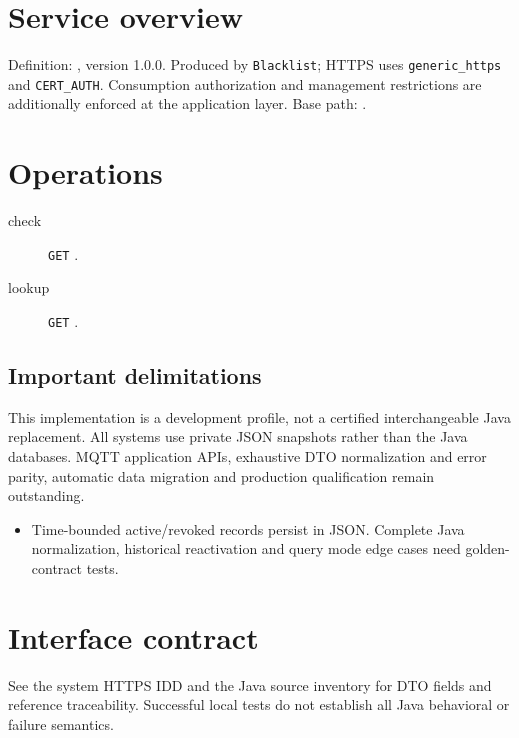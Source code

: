 \documentclass[a4paper]{arrowhead}
\begin{document}
\ArrowheadSetup
\section{Service overview}
Definition: , version 1.0.0. Produced by \texttt{Blacklist}; HTTPS uses \texttt{generic\_https} and \texttt{CERT\_AUTH}. Consumption authorization and management restrictions are additionally enforced at the application layer. Base path: .
\section{Operations}
\begin{description}
\item[check] \texttt{GET} .
\item[lookup] \texttt{GET} .
\end{description}
\subsection{Important delimitations}
This implementation is a development profile, not a certified interchangeable Java replacement. All systems use private JSON snapshots rather than the Java databases. MQTT application APIs, exhaustive DTO normalization and error parity, automatic data migration and production qualification remain outstanding.
\begin{itemize}
\item Time-bounded active/revoked records persist in JSON. Complete Java normalization, historical reactivation and query mode edge cases need golden-contract tests.
\end{itemize}
\section{Interface contract}
See the system HTTPS IDD and the Java source inventory for DTO fields and reference traceability. Successful local tests do not establish all Java behavioral or failure semantics.
\end{document}
